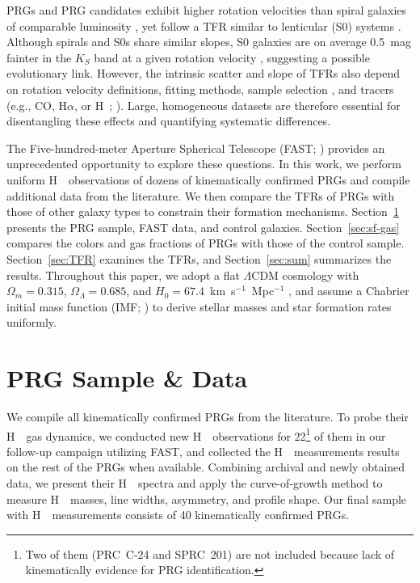 \documentclass[twocolumn]{aastex631}
\def\HI{H\,  {\textsc{\romannumeral 1}}}
\begin{document}
PRGs and PRG candidates exhibit higher rotation velocities than spiral galaxies of comparable luminosity \citep{Iodice2003ApJ...585..730I, Reshetnikov2004A&A...416..889R}, yet follow a TFR similar to lenticular (S0) systems \citep{Knapp1985A&A...142....1K}. Although spirals and S0s share similar slopes, S0 galaxies are on average 0.5~mag fainter in the $K_S$ band at a given rotation velocity \citep{Williams2010MNRAS.409.1330W}, suggesting a possible evolutionary link. However, the intrinsic scatter and slope of TFRs also depend on rotation velocity definitions, fitting methods, sample selection \citep{Bradford2016ApJ...832...11B}, and tracers (e.g., CO, H$\alpha$, or \HI; \citealt{Lelli2019MNRAS.484.3267L}). Large, homogeneous datasets are therefore essential for disentangling these effects and quantifying systematic differences.

The Five-hundred-meter Aperture Spherical Telescope (FAST; \citealt{Nan2011IJMPD..20..989N, Li2018IMMag..19..112L}) provides an unprecedented opportunity to explore these questions. In this work, we perform uniform \HI\ observations of dozens of kinematically confirmed PRGs and compile additional data from the literature. We then compare the TFRs of PRGs with those of other galaxy types to constrain their formation mechanisms. Section~\ref{sec:sample} presents the PRG sample, FAST data, and control galaxies. Section~\ref{sec:sf-gas} compares the colors and gas fractions of PRGs with those of the control sample. Section~\ref{sec:TFR} examines the TFRs, and Section~\ref{sec:sum} summarizes the results. Throughout this paper, we adopt a flat $\Lambda$CDM cosmology with $\Omega_m = 0.315$, $\Omega_\Lambda = 0.685$, and $H_0 = 67.4$~km~s$^{-1}$~Mpc$^{-1}$ \citep{PlanckCollaboration2020AA...641A...6P}, and assume a Chabrier initial mass function (IMF; \citealt{Chabrier2003PASP..115..763C}) to derive stellar masses and star formation rates uniformly.

\section{PRG Sample \& Data}
\label{sec:sample}

We compile all kinematically confirmed PRGs from the literature. To probe their \HI\ gas dynamics, we conducted new \HI\ observations for 22\footnote{Two of them (PRC~C-24 and SPRC~201) are not included because lack of kinematically evidence for PRG identification.} of them in our follow-up campaign utilizing FAST, and collected the \HI\ measurements results on the rest of the PRGs when available. Combining archival and newly obtained data, we present their \HI\ spectra and apply the curve-of-growth method \citep{Yu2020ApJ...898..102Y, Yu2022ApJS..261...21Y} to measure \HI\ masses, line widths, asymmetry, and profile shape. Our final sample with \HI\ measurements consists of 40 kinematically confirmed PRGs.
\end{document}
